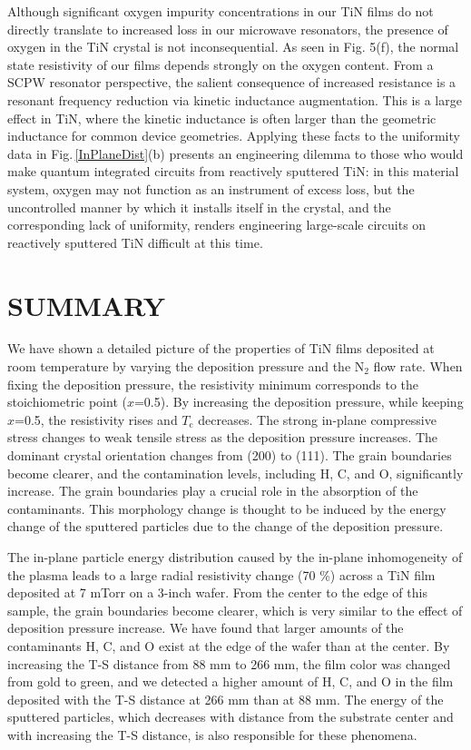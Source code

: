 \documentclass{report}
\begin{document}
Although significant oxygen impurity concentrations in our TiN films do not directly translate to increased loss in our microwave resonators, the presence of oxygen in the TiN crystal is not inconsequential.  As seen in Fig. 5(f), the normal state resistivity of our films depends strongly on the oxygen content.  From a SCPW resonator perspective, the salient consequence of increased resistance is a resonant frequency reduction via kinetic inductance augmentation.  This is a large effect in TiN, where the kinetic inductance is often larger than the geometric inductance for common device geometries.  Applying these facts to the uniformity data in Fig.\,\ref{InPlaneDist}(b)  presents an engineering dilemma to those who would make quantum integrated circuits from reactively sputtered TiN: in this material system, oxygen may not function as an instrument of excess loss, but the uncontrolled manner by which it installs itself in the crystal, and the corresponding lack of uniformity, renders engineering large-scale circuits on reactively sputtered TiN difficult at this time.								

\section{SUMMARY}
We have shown a detailed picture of the properties of TiN films deposited at room temperature by varying the deposition pressure and the N$_{2}$ flow rate. When fixing the deposition pressure, the resistivity minimum corresponds to the stoichiometric point ($x$=0.5). By increasing the deposition pressure, while keeping $x$=0.5, the resistivity rises and $T_{\text{c}}$ decreases. The strong in-plane compressive stress changes to weak tensile stress as the deposition pressure increases. The dominant crystal orientation changes from (200) to (111). The grain boundaries become clearer, and the contamination levels, including H, C, and O, significantly increase. The grain boundaries play a crucial role in the absorption of the contaminants. This morphology change is thought to be induced by the energy change of the sputtered particles due to the change of the deposition pressure.

The in-plane particle energy distribution caused by the in-plane inhomogeneity of the plasma leads to a large radial resistivity change (70 \%) across a TiN film deposited at 7 mTorr on a 3-inch wafer. From the center to the edge of this sample, the grain boundaries become clearer, which is very similar to the effect of deposition pressure increase. We have found that larger amounts of the contaminants H, C, and O exist at the edge of the wafer than at the center. By increasing the T-S distance from 88 mm to 266 mm, the film color was changed from gold to green, and we detected a higher amount of H, C, and O in the film deposited with the T-S distance at 266 mm than at 88 mm. The energy of the sputtered particles, which decreases with distance from the substrate center and with increasing the T-S distance, is also responsible for these phenomena.
\end{document}
